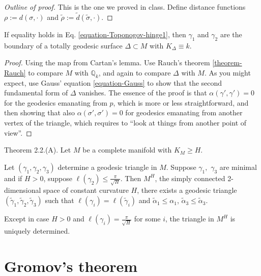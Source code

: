 \documentclass{book}
\begin{document}
\begin{proof}[Outline of proof]
This is the one we proved in class. Define
distance functions
$\rho:=d(\sigma,\cdot)$ and
$\tilde{\rho}:=\tilde{d}(\tilde{\sigma},
\cdot)$.
\end{proof}

\begin{lemma}
\label{lemma-equality-Toponogov}
If equality holds in Eq.
\ref{equation-Toponogov-hinge1}, then
$\gamma_1$ and
$\gamma_2$ are the boundary of a totally
geodesic surface $\Delta \subset M$
with $K_\Delta \equiv k$.
\end{lemma}

\begin{proof}
Using the map from Cartan's lemma. Use
Rauch's theorem \ref{theorem-Rauch} to
compare $M$ with $\mathbb{Q}_k$, and again to
compare $\Delta$ with $M$. As you
might expect, use Gauss' equation
\ref{equation-Gauss} to show that the second
fundamental form of $\Delta$ vanishes. The
essence of the proof is that
$\alpha(\gamma',\gamma')=0$ for the geodesics
emanating from $p$, which is more
or less straightforward, and then showing
that also $\alpha(\sigma',\sigma')=0$
for geodesics emanating from another vertex
of the triangle, which requires to
``look at things from another point of
view''.
\end{proof}

\begin{theorem}
\label{theorem-Toponogov-angle}
\cite{Cheeger-Ebin} Theorem 2.2.(A). Let $M$
be a complete manifold with
$K_M\geq H$.

Let $(\gamma_1,\gamma_2,\gamma_3)$ determine
a geodesic triangle in $M$. Suppose
$\gamma_1,$ $\gamma_3$ are minimal and if
$H>0$, suppose $\ell(\gamma_2)\leq
\frac{\pi}{\sqrt{H}}$. Then $M^H$, the simply
connected 2-dimensional space of
constant curvature $H$, there exists a
geodesic triangle
$(\tilde{\gamma}_1,\tilde{\gamma}_2,
\tilde{\gamma}_3)$
such that
$\ell(\gamma_i)=\ell(\tilde{\gamma}_i)$ and
$\tilde{\alpha}_1 \leq\alpha_1$,
$\tilde{\alpha}_3 \leq \tilde{\alpha}_3$.

Except in case $H>0$ and
$\ell(\gamma_i)=\frac{\pi}{\sqrt{H}}$ for
some $i$, the
triangle in $M^H$ is uniquely determined.
\end{theorem}

\section{Gromov's theorem}
\label{section-Gromov-theorem}
\end{document}

